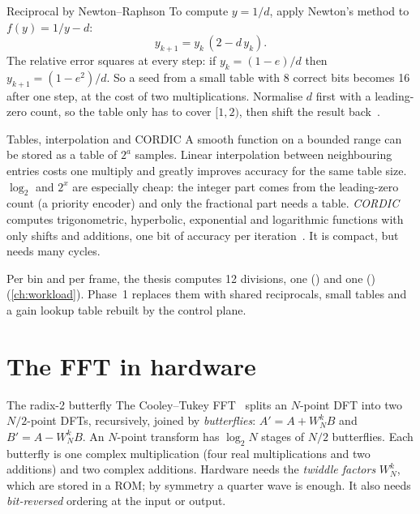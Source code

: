 \begin{conceptbox}{Reciprocal by Newton--Raphson}
To compute $y=1/d$, apply Newton's method to $f(y)=1/y-d$:
\begin{equation}
  y_{k+1} = y_k\,(2 - d\,y_k).
\end{equation}
The relative error squares at every step: if $y_k=(1-e)/d$ then
$y_{k+1}=(1-e^2)/d$. So a seed from a small table with 8 correct bits becomes 16
after one step, at the cost of two multiplications. Normalise $d$ first with a
leading-zero count, so the table only has to cover $[1,2)$, then shift the
result back~\cite{muller2016elementary}.
\end{conceptbox}

\begin{conceptbox}{Tables, interpolation and CORDIC}
A smooth function on a bounded range can be stored as a table of $2^a$ samples.
Linear interpolation between neighbouring entries costs one multiply and greatly
improves accuracy for the same table size. $\log_2$ and $2^x$ are especially
cheap: the integer part comes from the leading-zero count (a priority encoder)
and only the fractional part needs a table. \emph{CORDIC} computes trigonometric,
hyperbolic, exponential and logarithmic functions with only shifts and
additions, one bit of accuracy per iteration~\cite{volder1959cordic}. It is
compact, but needs many cycles.
\end{conceptbox}

\begin{whybox}
Per bin and per frame, the thesis computes 12 divisions, one 
() and one  ()
(\cref{ch:workload}). Phase~1 replaces them with shared reciprocals, small
tables and a gain lookup table rebuilt by the control plane.
\end{whybox}

\section{The FFT in hardware}\label{sec:primer:fft}

\begin{conceptbox}{The radix-2 butterfly}
The Cooley--Tukey FFT~\cite{cooley1965fft} splits an $N$-point DFT into two
$N/2$-point DFTs, recursively, joined by \emph{butterflies}:
$A' = A + W_N^k B$ and $B' = A - W_N^k B$. An $N$-point transform has $\log_2 N$
stages of $N/2$ butterflies. Each butterfly is one complex multiplication (four
real multiplications and two additions) and two complex additions. Hardware
needs the \emph{twiddle factors} $W_N^k$, which are stored in a ROM; by symmetry
a quarter wave is enough. It also needs \emph{bit-reversed} ordering at the input
or output.
\end{conceptbox}

